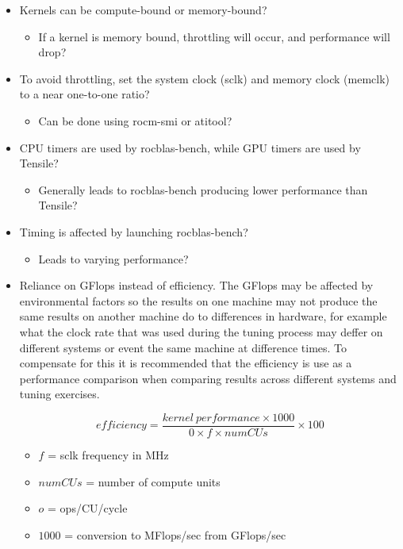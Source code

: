 \documentclass[]{article}
\begin{document}
\begin{itemize}

\item Kernels can be compute-bound or memory-bound?
	
 \begin{itemize}
 	\item If a kernel is memory bound, throttling will occur, and performance will drop?
 \end{itemize}

\item To avoid throttling, set the system clock (sclk) and memory clock (memclk) to a near one-to-one ratio?

  \begin{itemize}
  	\item Can be done using rocm-smi or atitool?
  \end{itemize}

\item CPU timers are used by rocblas-bench, while GPU timers are used by Tensile?

  \begin{itemize}
   	\item Generally leads to rocblas-bench producing lower performance than Tensile?
  \end{itemize}

\item Timing is affected by launching rocblas-bench?

  \begin{itemize}
  	\item Leads to varying performance?
  \end{itemize}

\item Reliance on GFlops instead of efficiency. The GFlops may be affected by environmental factors so the results on one machine may not produce the same results on another machine do to differences in hardware, for example what the clock rate that was used during the tuning process may deffer on different systems or event the same machine at difference times. To compensate for this it is recommended that the efficiency is use as a performance comparison when comparing results across different systems and tuning exercises. 

$$ efficiency = \frac{kernel\ performance \times 1000}{0 \times f \times numCUs} \times 100 $$

\begin{itemize}
	\item $f$ = sclk frequency in MHz
	\item $numCUs$ = number of compute units
	\item $o$ = ops/CU/cycle
	\item $1000$ = conversion to MFlops/sec from GFlops/sec
\end{itemize}
  

\end{itemize}
\end{document}
